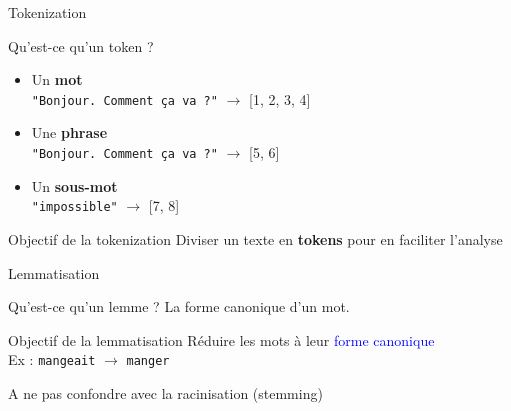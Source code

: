 \begin{frame}{Tokenization}
    \begin{block}{Qu'est-ce qu'un token ?}
        \smallskip
        \begin{itemize}
            \item Un \textbf{mot}\\
            {\footnotesize \texttt{"Bonjour. Comment ça va ?"} $\rightarrow$ [1, 2, 3, 4]}
            \item Une \textbf{phrase}\\
            {\footnotesize \texttt{"Bonjour. Comment ça va ?"} $\rightarrow$ [5, 6]}
            \item Un \textbf{sous-mot}\\
            {\footnotesize \texttt{"impossible"} $\rightarrow$ [7, 8]}
        \end{itemize}
        
    \end{block}
    
    \bigskip
    
    \begin{block}{Objectif de la tokenization}
        \smallskip
        Diviser un texte en \textbf{tokens} pour en faciliter l'analyse
    \end{block}
\end{frame}



\begin{frame}{Lemmatisation}

    \begin{block}{Qu'est-ce qu'un lemme ?}
        \smallskip
        La forme canonique d'un mot.
    \end{block}

    \bigskip

    \begin{block}{Objectif de la lemmatisation}
        \smallskip
        Réduire les mots à leur \textcolor{blue}{forme canonique}\\
        Ex : \texttt{mangeait} $\rightarrow$ \texttt{manger}

        A ne pas confondre avec la racinisation (stemming)
    \end{block}

\end{frame}

